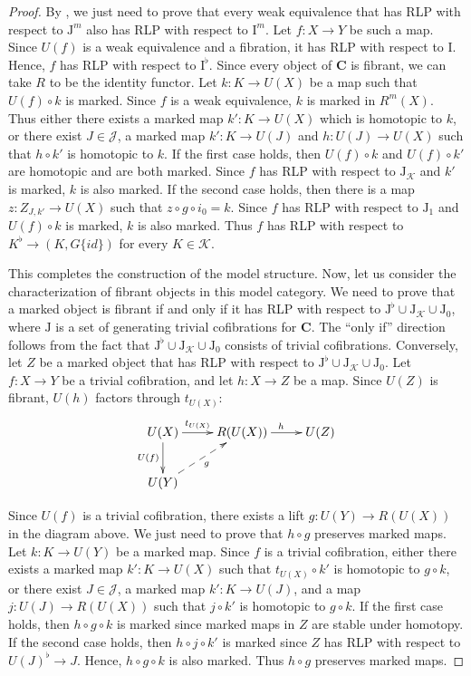 \documentclass[reqno]{amsart}
\theoremstyle{definition}
\theoremstyle{remark}
\newcommand{\cat}[1]{\mathbf{#1}}
\newcommand{\C}{\cat{C}}
\newcommand{\I}{\mathrm{I}}
\newcommand{\J}{\mathrm{J}}
\numberwithin{figure}{section}
\begin{document}
\begin{proof}
By , we just need to prove that every weak equivalence that has RLP with respect to $\J^m$ also has RLP with respect to $\I^m$.
Let $f : X \to Y$ be such a map.
Since $U(f)$ is a weak equivalence and a fibration, it has RLP with respect to $\I$.
Hence, $f$ has RLP with respect to $\I^\flat$.
Since every object of $\C$ is fibrant, we can take $R$ to be the identity functor.
Let $k : K \to U(X)$ be a map such that $U(f) \circ k$ is marked.
Since $f$ is a weak equivalence, $k$ is marked in $R^m(X)$.
Thus either there exists a marked map $k' : K \to U(X)$ which is homotopic to $k$,
or there exist $J \in \mathcal{J}$, a marked map $k' : K \to U(J)$ and $h : U(J) \to U(X)$ such that $h \circ k'$ is homotopic to $k$.
If the first case holds, then $U(f) \circ k$ and $U(f) \circ k'$ are homotopic and are both marked.
Since $f$ has RLP with respect to $\J_\mathcal{K}$ and $k'$ is marked, $k$ is also marked.
If the second case holds, then there is a map $z : Z_{J,k'} \to U(X)$ such that $z \circ g \circ i_0 = k$.
Since $f$ has RLP with respect to $\J_1$ and $U(f) \circ k$ is marked, $k$ is also marked.
Thus $f$ has RLP with respect to $K^\flat \to (K, G \{id\})$ for every $K \in \mathcal{K}$.

This completes the construction of the model structure.
Now, let us consider the characterization of fibrant objects in this model category.
We need to prove that a marked object is fibrant if and only if it has RLP with respect to $\J^\flat \cup \J_\mathcal{K} \cup \J_0$,
where $\J$ is a set of generating trivial cofibrations for $\C$.
The ``only if'' direction follows from the fact that $\J^\flat \cup \J_\mathcal{K} \cup \J_0$ consists of trivial cofibrations.
Conversely, let $Z$ be a marked object that has RLP with respect to $\J^\flat \cup \J_\mathcal{K} \cup \J_0$.
Let $f : X \to Y$ be a trivial cofibration, and let $h : X \to Z$ be a map.
Since $U(Z)$ is fibrant, $U(h)$ factors through $t_{U(X)}$:
\[ \xymatrix{ U(X) \ar[r]^-{t_{U(X)}} \ar[d]_{U(f)} & R(U(X)) \ar[r]^h & U(Z) \\
              U(Y) \ar@{-->}[ur]_g
            } \]

Since $U(f)$ is a trivial cofibration, there exists a lift $g : U(Y) \to R(U(X))$ in the diagram above.
We just need to prove that $h \circ g$ preserves marked maps.
Let $k : K \to U(Y)$ be a marked map.
Since $f$ is a trivial cofibration, either there exists a marked map $k' : K \to U(X)$ such that $t_{U(X)} \circ k'$ is homotopic to $g \circ k$,
or there exist $J \in \mathcal{J}$, a marked map $k' : K \to U(J)$, and a map $j : U(J) \to R(U(X))$ such that $j \circ k'$ is homotopic to $g \circ k$.
If the first case holds, then $h \circ g \circ k$ is marked since marked maps in $Z$ are stable under homotopy.
If the second case holds, then $h \circ j \circ k'$ is marked since $Z$ has RLP with respect to $U(J)^\flat \to J$.
Hence, $h \circ g \circ k$ is also marked.
Thus $h \circ g$ preserves marked maps.


\end{proof}
\end{document}
